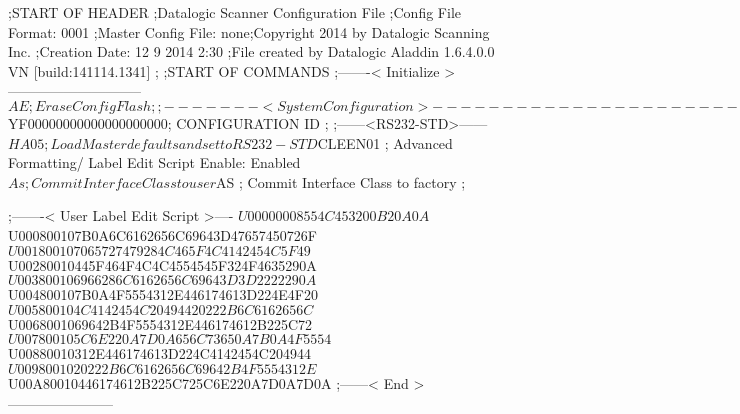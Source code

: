 ;START OF HEADER
;Datalogic Scanner Configuration File
;Config File Format: 0001
;Master Config File: none;Copyright 2014 by Datalogic Scanning Inc.
;Creation Date: 12 9 2014 2:30
;File created by Datalogic Aladdin 1.6.4.0.0 VN [build:141114.1341]
;
;START OF COMMANDS
;-------< Initialize >-----------------------------
$AE                 ; Erase Config Flash
;
;-------< System Configuration >-------------------------------
$YF00000000000000000000; CONFIGURATION ID
;
;------<RS232-STD>------
$HA05               ; Load Master defaults and set to RS232-STD
$CLEEN01            ; Advanced Formatting/ Label Edit Script Enable: Enabled
$As                 ; Commit Interface Class to user
$AS                 ; Commit Interface Class to factory
;

;-------< User Label Edit Script >----
$U00000008554C453200B20A0A
$U000800107B0A6C6162656C69643D47657450726F
$U001800107065727479284C465F4C4142454C5F49
$U00280010445F464F4C4C4554545F324F4635290A
$U003800106966286C6162656C69643D3D2222290A
$U004800107B0A4F5554312E446174613D224E4F20
$U005800104C4142454C20494420222B6C6162656C
$U0068001069642B4F5554312E446174612B225C72
$U007800105C6E220A7D0A656C73650A7B0A4F5554
$U00880010312E446174613D224C4142454C204944
$U0098001020222B6C6162656C69642B4F5554312E
$U00A80010446174612B225C725C6E220A7D0A7D0A
;------< End >-----------------------
